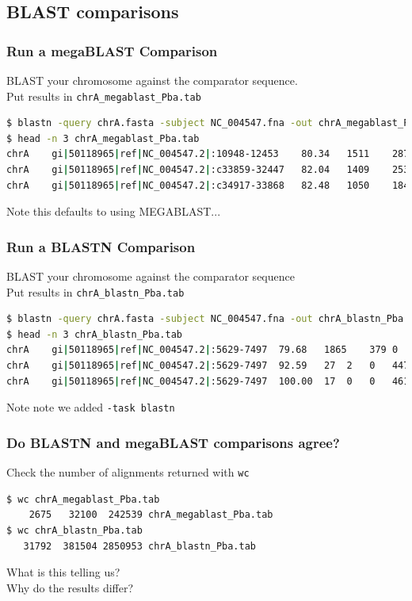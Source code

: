 \documentclass[table]{beamer}
\begin{document}
  \subsection{BLAST comparisons}
  \begin{frame}[fragile]
    \frametitle{Run a megaBLAST Comparison}
    BLAST your chromosome against the comparator sequence. \\
    Put results in \texttt{chrA\_megablast\_Pba.tab}
\begin{lstlisting}[language=bash]
$ blastn -query chrA.fasta -subject NC_004547.fna -out chrA_megablast_Pba.tab -outfmt 6 
$ head -n 3 chrA_megablast_Pba.tab 
chrA	gi|50118965|ref|NC_004547.2|:10948-12453	80.34	1511	287	10	4579450	4580955	1506	1	0.0	1136
chrA	gi|50118965|ref|NC_004547.2|:c33859-32447	82.04	1409	253	0	4563151	4564559	1	1409	0.0	1201
chrA	gi|50118965|ref|NC_004547.2|:c34917-33868	82.48	1050	184	0	4562093	4563142	1	1050	0.0	 920
\end{lstlisting}
Note this defaults to using MEGABLAST...
\end{frame}
    
  \begin{frame}[fragile]
    \frametitle{Run a BLASTN Comparison}
    BLAST your chromosome against the comparator sequence \\
    Put results in \texttt{chrA\_blastn\_Pba.tab}
\begin{lstlisting}[language=bash]
$ blastn -query chrA.fasta -subject NC_004547.fna -out chrA_blastn_Pba.tab -outfmt 6 -task blastn
$ head -n 3 chrA_blastn_Pba.tab 
chrA	gi|50118965|ref|NC_004547.2|:5629-7497	79.68	1865	379	0	4584915	4586779	1865	1	0.0	1654
chrA	gi|50118965|ref|NC_004547.2|:5629-7497	92.59	27	2	0	4479367	4479393	1254	1280	0.004	41.0
chrA	gi|50118965|ref|NC_004547.2|:5629-7497	100.00	17	0	0	4613022	4613038	52	36	2.1	31.9
\end{lstlisting}
Note note we added \texttt{-task blastn}
\end{frame}
    
  \begin{frame}[fragile]
    \frametitle{Do BLASTN and megaBLAST comparisons agree?}
    Check the number of alignments returned with \texttt{wc}
\begin{lstlisting}[language=bash]
$ wc chrA_megablast_Pba.tab 
    2675   32100  242539 chrA_megablast_Pba.tab
$ wc chrA_blastn_Pba.tab
   31792  381504 2850953 chrA_blastn_Pba.tab
\end{lstlisting}
    What is this telling us? \\
    Why do the results differ?
\end{frame}
\end{document}
